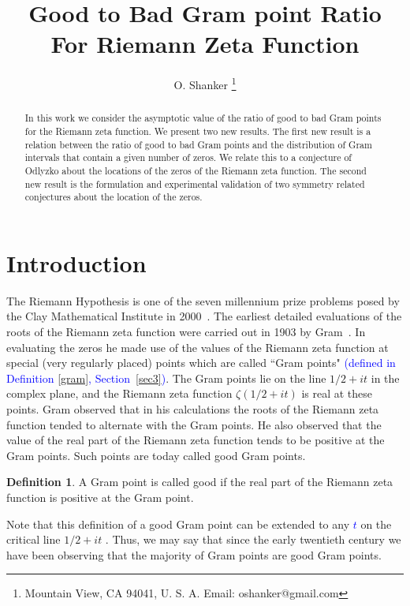 \documentclass[twoside]{article}
\theoremstyle{definition}
\newtheorem{defn}{Definition}
\begin{document}
\date{}
\lhead[]{}
\chead[]{}
\rhead[]{}

\title{\bf{Good to Bad Gram point Ratio For Riemann Zeta Function}}
%

\author{O. Shanker 
 \thanks{Mountain View, CA 94041, U. S. A. Email: oshanker@gmail.com
 }
}

\maketitle
\thispagestyle{fancy}

\begin{abstract}
In this work we consider the asymptotic value of the ratio of good to bad Gram points for the Riemann zeta function.
We present two new results. The first new result is a relation between the ratio of good to bad Gram points and the distribution of Gram intervals that contain a given number of zeros.
We relate this to a conjecture of Odlyzko about the locations of the zeros of the Riemann zeta function.
The  second new result is the formulation and experimental validation of two 
symmetry related conjectures about the location of the zeros.
\end{abstract}



{}


\section{Introduction}
The Riemann Hypothesis is one of the seven millennium prize problems posed by the Clay Mathematical Institute in 2000~\cite{Sarnak 2005}. 
The earliest detailed evaluations of the roots of the Riemann zeta function were carried out in 1903 by Gram~\cite{Gram 1903}.
In evaluating the zeros he made use of the values of the Riemann zeta function at special (very regularly placed) points which are called ``Gram points"
\textcolor{blue}{(defined in Definition \ref{gram}, Section~\ref{sec3})}.
The Gram points lie on the line $1/2+it$ in the complex plane, and the Riemann zeta function $\zeta(1/2+it)$ is real at these points. 
Gram observed that in his calculations the roots of the Riemann zeta function tended to alternate with the Gram points. He also observed that the
value of the real part of the Riemann zeta function tends to be positive at the Gram points. Such points are today called good Gram points. 
\begin{defn}\label{good0}
A Gram point is called good if the real part of the Riemann zeta function is positive at the Gram point.
\end{defn}
Note that this definition of a good Gram point can be extended to any \textcolor{blue}{$t$} on the critical line $1/2+it$ . Thus, we may say that since the early 
twentieth century we have been observing that the majority of Gram points are good Gram points. 
\end{document}
